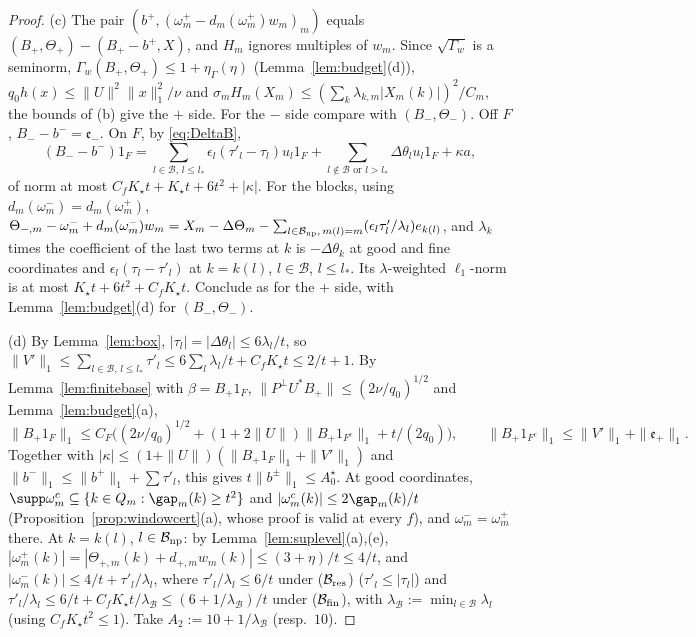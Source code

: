 \begin{proof}
(c) The pair $(b^+,(\omega^+_m-d_m(\omega^+_m)w_m)_m)$ equals
$(B_+,\Theta_+)-(B_+-b^+,X)$, and $H_m$ ignores multiples of $w_m$.  Since
$\sqrt{\Gamma_w}$ is a seminorm, $\Gamma_w(B_+,\Theta_+)\le1+\eta_\Gamma(\eta)$
(Lemma~\ref{lem:budget}(d)), $q_0h(x)\le\|U\|^2\|x\|_1^2/\nu$ and
$\sigma_mH_m(X_m)\le(\sum_k\lambda_{k,m}|X_m(k)|)^2/C_m$, the bounds of (b)
give the $+$ side.  For the $-$ side compare with $(B_-,\Theta_-)$.  Off
$F$, $B_--b^-=\mathfrak e_-$.  On $F$, by \eqref{eq:DeltaB},
\[
 (B_--b^-)1_F=\sum_{l\in\mathcal B,\,l\le l_*}\epsilon_l(\tau'_l-\tau_l)u_l1_F
 +\sum_{l\notin\mathcal B\text{ or }l>l_*}\Delta\theta_lu_l1_F+\kappa a,
\]
of norm at most $C_fK_\star t+K_\star t+6t^2+|\kappa|$.  For the blocks,
using $d_m(\omega^-_m)=d_m(\omega^+_m)$,
$\Theta_{-,m}-\omega^-_m+d_m(\omega^-_m)w_m=X_m-\Delta\Theta_m-\sum_{l\in
\mathcal B_{\rm np},\,m(l)=m}(\epsilon_l\tau'_l/\lambda_l)e_{k(l)}$, and
$\lambda_k$ times the coefficient of the last two terms at $k$ is
$-\Delta\theta_k$ at good and fine coordinates and $\epsilon_l(\tau_l-
\tau'_l)$ at $k=k(l)$, $l\in\mathcal B$, $l\le l_*$.  Its $\lambda$-weighted
$\ell_1$-norm is at most $K_\star t+6t^2+C_fK_\star t$.  Conclude as for the
$+$ side, with Lemma~\ref{lem:budget}(d) for $(B_-,\Theta_-)$.

(d) By Lemma~\ref{lem:box}, $|\tau_l|=|\Delta\theta_l|\le6\lambda_l/t$, so
$\|V'\|_1\le\sum_{l\in\mathcal B,\,l\le l_*}\tau'_l\le6\sum_l\lambda_l/t+
C_fK_\star t\le2/t+1$.  By Lemma~\ref{lem:finitebase} with $\beta=B_+1_F$,
$\|P^\perp U^*B_+\|\le(2\nu/q_0)^{1/2}$ and Lemma~\ref{lem:budget}(a),
\[
 \|B_+1_F\|_1\le C_F\big((2\nu/q_0)^{1/2}+(1+2\|U\|)\|B_+1_{F^c}\|_1+t/(2q_0)
 \big),\qquad\|B_+1_{F^c}\|_1\le\|V'\|_1+\|\mathfrak e_+\|_1 .
\]
Together with $|\kappa|\le(1+\|U\|)(\|B_+1_F\|_1+\|V'\|_1)$ and
$\|b^-\|_1\le\|b^+\|_1+\sum\tau'_l$, this gives $t\|b^\pm\|_1\le A^\star_0$.
At good coordinates, $\supp\omega^c_m\subseteq\{k\in Q_m:\gap_m(k)\ge t^2\}$
and $|\omega^c_m(k)|\le2\gap_m(k)/t$ (Proposition~\ref{prop:windowcert}(a),
whose proof is valid at every $f$), and $\omega^-_m=\omega^+_m$ there.  At
$k=k(l)$, $l\in\mathcal B_{\rm np}$: by Lemma~\ref{lem:suplevel}(a),(e),
$|\omega^+_m(k)|=|\Theta_{+,m}(k)+d_{+,m}w_m(k)|\le(3+\eta)/t\le4/t$, and
$|\omega^-_m(k)|\le4/t+\tau'_l/\lambda_l$, where $\tau'_l/\lambda_l\le6/t$
under ($\mathcal B_{\rm res}$) ($\tau'_l\le|\tau_l|$) and
$\tau'_l/\lambda_l\le6/t+C_fK_\star t/\lambda_{\mathcal B}\le(6+1/
\lambda_{\mathcal B})/t$ under ($\mathcal B_{\rm fin}$), with
$\lambda_{\mathcal B}:=\min_{l\in\mathcal B}\lambda_l$ (using $C_fK_\star t^2
\le1$).  Take $A_2:=10+1/\lambda_{\mathcal B}$ (resp.\ $10$).
\end{proof}

